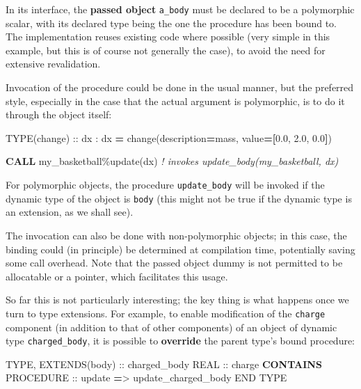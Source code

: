 \documentclass[
]{article}
\newenvironment{Shaded}{}{}
\newcommand{\CommentTok}[1]{\textcolor[rgb]{0.38,0.63,0.69}{\textit{#1}}}
\newcommand{\DataTypeTok}[1]{\textcolor[rgb]{0.56,0.13,0.00}{#1}}
\newcommand{\FloatTok}[1]{\textcolor[rgb]{0.25,0.63,0.44}{#1}}
\newcommand{\KeywordTok}[1]{\textcolor[rgb]{0.00,0.44,0.13}{\textbf{#1}}}
\newcommand{\NormalTok}[1]{#1}
\newcommand{\OperatorTok}[1]{\textcolor[rgb]{0.40,0.40,0.40}{#1}}
\newcommand{\StringTok}[1]{\textcolor[rgb]{0.25,0.44,0.63}{#1}}
\begin{document}
In its interface, the \textbf{passed object} \texttt{a\_body} must be
declared to be a polymorphic scalar, with its declared type being the
one the procedure has been bound to. The implementation reuses existing
code where possible (very simple in this example, but this is of course
not generally the case), to avoid the need for extensive revalidation.

Invocation of the procedure could be done in the usual manner, but the
preferred style, especially in the case that the actual argument is
polymorphic, is to do it through the object itself:

\begin{Shaded}
\begin{Highlighting}[]
\DataTypeTok{TYPE(change)} \DataTypeTok{::}\NormalTok{  dx}
\NormalTok{:}
\NormalTok{dx }\KeywordTok{=}\NormalTok{ change(description}\KeywordTok{=}\StringTok{\textquotesingle{}mass\textquotesingle{}}\NormalTok{, }\DataTypeTok{value}\KeywordTok{=[}\FloatTok{0.0}\NormalTok{, }\FloatTok{2.0}\NormalTok{, }\FloatTok{0.0}\KeywordTok{]}\NormalTok{)}

\KeywordTok{CALL}\NormalTok{ my\_basketball}\OperatorTok{\%}\NormalTok{update(dx) }\CommentTok{! invokes update\_body(my\_basketball, dx)}
\end{Highlighting}
\end{Shaded}

For polymorphic objects, the procedure \texttt{update\_body} will be
invoked if the dynamic type of the object is \texttt{body} (this might
not be true if the dynamic type is an extension, as we shall see).

The invocation can also be done with non-polymorphic objects; in this
case, the binding could (in principle) be determined at compilation
time, potentially saving some call overhead. Note that the passed object
dummy is not permitted to be allocatable or a pointer, which facilitates
this usage.

So far this is not particularly interesting; the key thing is what
happens once we turn to type extensions. For example, to enable
modification of the \texttt{charge} component (in addition to that of
other components) of an object of dynamic type \texttt{charged\_body},
it is possible to \textbf{override} the parent type's bound procedure:

\begin{Shaded}
\begin{Highlighting}[]
\DataTypeTok{TYPE}\NormalTok{, }\DataTypeTok{EXTENDS(body)} \DataTypeTok{::}\NormalTok{ charged\_body}
   \DataTypeTok{REAL} \DataTypeTok{::}\NormalTok{ charge}
\KeywordTok{CONTAINS}
   \DataTypeTok{PROCEDURE} \DataTypeTok{::}\NormalTok{ update }\KeywordTok{=}\OperatorTok{\textgreater{}}\NormalTok{ update\_charged\_body}
\DataTypeTok{END TYPE}
\end{Highlighting}
\end{Shaded}
\end{document}
